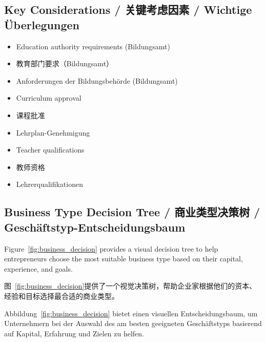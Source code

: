 \subsection{Key Considerations / 关键考虑因素 / Wichtige Überlegungen}
\begin{itemize}
    \item Education authority requirements (Bildungsamt)
    \item 教育部门要求（Bildungsamt）
    \item Anforderungen der Bildungsbehörde (Bildungsamt)
    \item Curriculum approval
    \item 课程批准
    \item Lehrplan-Genehmigung
    \item Teacher qualifications
    \item 教师资格
    \item Lehrerqualifikationen
\end{itemize}

\subsection{Business Type Decision Tree / 商业类型决策树 / Geschäftstyp-Entscheidungsbaum}

Figure~\ref{fig:business_decision} provides a visual decision tree to help entrepreneurs choose the most suitable business type based on their capital, experience, and goals.

图~\ref{fig:business_decision}提供了一个视觉决策树，帮助企业家根据他们的资本、经验和目标选择最合适的商业类型。

Abbildung~\ref{fig:business_decision} bietet einen visuellen Entscheidungsbaum, um Unternehmern bei der Auswahl des am besten geeigneten Geschäftstyps basierend auf Kapital, Erfahrung und Zielen zu helfen.

